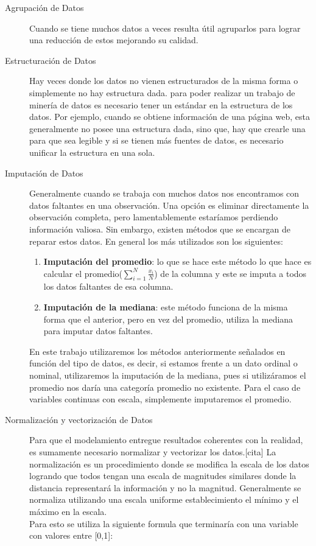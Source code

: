 \begin{description}
  \item[Agrupación de Datos]
  Cuando se tiene muchos datos a veces resulta útil agruparlos para lograr una reducción de estos mejorando su calidad.
  \item[Estructuración de Datos]
  Hay veces donde los datos no  vienen estructurados de la misma forma o simplemente no hay estructura dada. para poder realizar un trabajo de minería de datos es necesario tener un estándar en la estructura de los datos. Por ejemplo, cuando se obtiene información de una página web, esta generalmente no posee una estructura dada, sino que, hay que crearle una para que sea legible y si se tienen más fuentes de datos, es necesario unificar la estructura en una sola.
  \item[Imputación de Datos]
  Generalmente cuando se trabaja con muchos datos nos encontramos con datos faltantes en una observación. Una opción es eliminar directamente la observación completa, pero lamentablemente estaríamos perdiendo información valiosa. Sin embargo, existen métodos que se encargan de reparar estos datos. En general los más utilizados son los siguientes:
 \begin{enumerate}[label=\itshape\alph*\upshape)]
  \item \textbf{Imputación del promedio}: lo que se hace este método lo que hace es calcular el promedio($\sum_{i=1}^N \frac{x_i}{N}$) de la columna y este se imputa a todos los datos faltantes de esa columna.
  \item \textbf{Imputación de la mediana}: este método funciona de la misma forma que el anterior, pero en vez del promedio, utiliza la mediana para imputar datos faltantes.
  \end{enumerate}
  En este trabajo utilizaremos los métodos anteriormente señalados en función del tipo de datos, es decir, si estamos frente a un dato ordinal o nominal, utilizaremos la imputación de la mediana, pues si utilizáramos el promedio nos daría una categoría promedio no existente. Para el caso de variables continuas con escala, simplemente imputaremos el promedio.
  \item[Normalización y vectorización de Datos]
  Para que el modelamiento entregue resultados coherentes con la realidad, es sumamente necesario normalizar y vectorizar los datos.[cita]
  La normalización es un procedimiento donde se modifica la escala de los datos logrando que todos tengan una escala de magnitudes similares donde la distancia representará la información y no la magnitud. Generalmente se normaliza utilizando una escala uniforme establecimiento el mínimo y el máximo en la escala. \\Para esto se utiliza la siguiente formula que terminaría con una variable con valores entre [0,1]:

\end{description}
